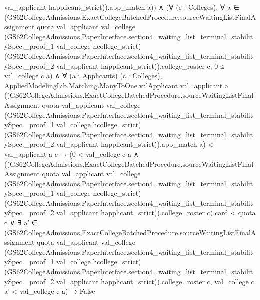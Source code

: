 \documentclass[10pt]{article}
\begin{document}
\begin{ReviewVerbatim}
                    val_applicant happlicant_strict)).app_match
              a)) ∧
      (∀ (c : Colleges),
          ∀
            a ∈
              (GS62CollegeAdmissions.ExactCollegeBatchedProcedure.sourceWaitingListFinalAssignment quota val_applicant
                    val_college
                    (GS62CollegeAdmissions.PaperInterface.section4_waiting_list_terminal_stabilitySpec._proof_1
                      val_college hcollege_strict)
                    (GS62CollegeAdmissions.PaperInterface.section4_waiting_list_terminal_stabilitySpec._proof_2
                      val_applicant happlicant_strict)).college_roster
                c,
            0 ≤ val_college c a) ∧
        ∀ (a : Applicants) (c : Colleges),
          AppliedModelingLib.Matching.ManyToOne.valApplicant val_applicant a
                ((GS62CollegeAdmissions.ExactCollegeBatchedProcedure.sourceWaitingListFinalAssignment quota
                      val_applicant val_college
                      (GS62CollegeAdmissions.PaperInterface.section4_waiting_list_terminal_stabilitySpec._proof_1
                        val_college hcollege_strict)
                      (GS62CollegeAdmissions.PaperInterface.section4_waiting_list_terminal_stabilitySpec._proof_2
                        val_applicant happlicant_strict)).app_match
                  a) <
              val_applicant a c →
            (0 < val_college c a ∧
                  ((GS62CollegeAdmissions.ExactCollegeBatchedProcedure.sourceWaitingListFinalAssignment quota
                            val_applicant val_college
                            (GS62CollegeAdmissions.PaperInterface.section4_waiting_list_terminal_stabilitySpec._proof_1
                              val_college hcollege_strict)
                            (GS62CollegeAdmissions.PaperInterface.section4_waiting_list_terminal_stabilitySpec._proof_2
                              val_applicant happlicant_strict)).college_roster
                        c).card <
                    quota c ∨
                ∃
                  a' ∈
                    (GS62CollegeAdmissions.ExactCollegeBatchedProcedure.sourceWaitingListFinalAssignment quota
                          val_applicant val_college
                          (GS62CollegeAdmissions.PaperInterface.section4_waiting_list_terminal_stabilitySpec._proof_1
                            val_college hcollege_strict)
                          (GS62CollegeAdmissions.PaperInterface.section4_waiting_list_terminal_stabilitySpec._proof_2
                            val_applicant happlicant_strict)).college_roster
                      c,
                  val_college c a' < val_college c a) →
              False
\end{ReviewVerbatim}
\end{document}
